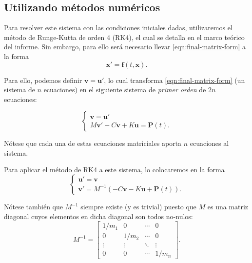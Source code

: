 \subsection{Utilizando métodos numéricos}

Para resolver este sistema con las condiciones iniciales dadas, utilizaremos el método de Runge-Kutta de orden 4 (RK4), el cual se detalla en el marco teórico del informe. Sin embargo, para ello será necesario llevar \eqref{eqn:final-matrix-form} a la forma
\[
    \mathbf{x}' = \mathbf{f}(t, \mathbf{x})
.\]

Para ello, podemos definir \(\mathbf{v} = \mathbf{u}'\), lo cual transforma \eqref{eqn:final-matrix-form} (un sistema de \(n\) ecuaciones) en el siguiente sistema de \textit{primer orden} de \(2n\) ecuaciones:

\[
    \begin{cases}
        \mathbf{v} = \mathbf{u}' \\
        M\mathbf{v}' + C\mathbf{v} + K\mathbf{u} = \mathbf{P}(t)
    .\end{cases}
\]

Nótese que cada una de estas ecuaciones matriciales aporta \(n\) ecuaciones al sistema.

Para aplicar el método de RK4 a este sistema, lo colocaremos en la forma
\begin{equation}\label{eqn:substituted-system}
    \begin{cases}
        \mathbf{u}' = \mathbf{v} \\
        \mathbf{v}' = M^{-1}(-C\mathbf{v} - K\mathbf{u} + \mathbf{P}(t))
    .\end{cases}
\end{equation}

Nótese también que \(M^{-1}\) siempre existe (y es trivial) puesto que \(M\) es una matriz diagonal cuyos elementos en dicha diagonal son todos no-nulos:
\[
    M^{-1} = \begin{bmatrix}
        1/m_1 & 0 & \cdots & 0 \\
        0 & 1/m_2 & \cdots & 0 \\
        \vdots & \vdots & \ddots & \vdots \\
        0 & 0 & \cdots & 1/m_n
    \end{bmatrix}
.\]

